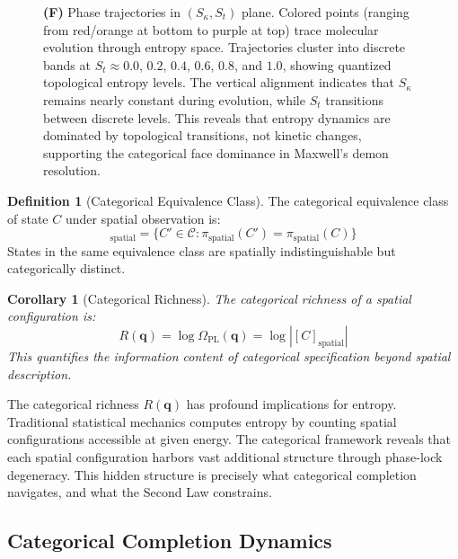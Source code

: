 \documentclass[12pt,a4paper]{article}
\newtheorem{corollary}[theorem]{Corollary}
\theoremstyle{definition}
\newtheorem{definition}[theorem]{Definition}
\theoremstyle{remark}
\newcommand{\catspace}{\mathcal{C}}
\begin{document}
\begin{figure}[htbp]
{\textbf{(F)} Phase trajectories in $(S_{\kappa}, S_t)$ plane. Colored points (ranging from red/orange at bottom to purple at top) trace molecular evolution through entropy space. Trajectories cluster into discrete bands at $S_t \approx 0.0$, $0.2$, $0.4$, $0.6$, $0.8$, and $1.0$, showing quantized topological entropy levels. The vertical alignment indicates that $S_{\kappa}$ remains nearly constant during evolution, while $S_t$ transitions between discrete levels. This reveals that entropy dynamics are dominated by topological transitions, not kinetic changes, supporting the categorical face dominance in Maxwell's demon resolution.}
\label{fig:s_space}
\end{figure}


\begin{definition}[Categorical Equivalence Class]
\label{def:categorical_equivalence_class}
The categorical equivalence class of state $C$ under spatial observation is:
\begin{equation}
[C]_{\text{spatial}} = \{C' \in \catspace : \pi_{\text{spatial}}(C') = \pi_{\text{spatial}}(C)\}
\end{equation}
States in the same equivalence class are spatially indistinguishable but categorically distinct.
\end{definition}

\begin{corollary}[Categorical Richness]
\label{cor:categorical_richness}
The categorical richness of a spatial configuration is:
\begin{equation}
R(\mathbf{q}) = \log \Omega_{\text{PL}}(\mathbf{q}) = \log |[C]_{\text{spatial}}|
\end{equation}
This quantifies the information content of categorical specification beyond spatial description.
\end{corollary}

The categorical richness $R(\mathbf{q})$ has profound implications for entropy. Traditional statistical mechanics computes entropy by counting spatial configurations accessible at given energy. The categorical framework reveals that each spatial configuration harbors vast additional structure through phase-lock degeneracy. This hidden structure is precisely what categorical completion navigates, and what the Second Law constrains.

\subsection{Categorical Completion Dynamics}
\end{document}
